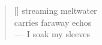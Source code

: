 \documentclass[12pt,a4paper]{article}
\begin{document}
\thispagestyle{empty}

\poemtitle{}

\settowidth{\versewidth}{carries faraway echos}

\bigskip

\begin{verse}[\versewidth]
streaming meltwater \\
carries faraway echos \\
---~I soak my sleeves
\end{verse}
\end{document}
